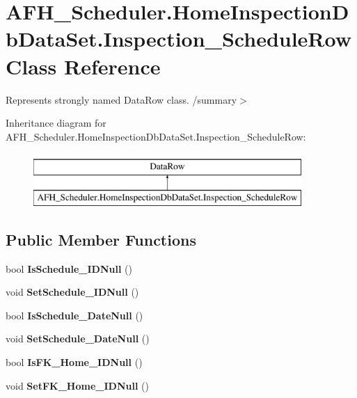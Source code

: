 \section{A\+F\+H\+\_\+\+Scheduler.\+Home\+Inspection\+Db\+Data\+Set.\+Inspection\+\_\+\+Schedule\+Row Class Reference}
\label{class_a_f_h___scheduler_1_1_home_inspection_db_data_set_1_1_inspection___schedule_row}


Represents strongly named Data\+Row class. /summary$>$  


Inheritance diagram for A\+F\+H\+\_\+\+Scheduler.\+Home\+Inspection\+Db\+Data\+Set.\+Inspection\+\_\+\+Schedule\+Row\+:\begin{figure}[H]
\begin{center}
\leavevmode
\includegraphics[height=2.000000cm]{class_a_f_h___scheduler_1_1_home_inspection_db_data_set_1_1_inspection___schedule_row}
\end{center}
\end{figure}
\subsection*{Public Member Functions}
\begin{DoxyCompactItemize}
\item 
\mbox{\label{class_a_f_h___scheduler_1_1_home_inspection_db_data_set_1_1_inspection___schedule_row_a7b9fed76e83859dfbe601bd934aa0bf4}} 
bool {\bfseries Is\+Schedule\+\_\+\+I\+D\+Null} ()
\item 
\mbox{\label{class_a_f_h___scheduler_1_1_home_inspection_db_data_set_1_1_inspection___schedule_row_a4d49aa921f7b8b19ccb8636b8e4cdaf7}} 
void {\bfseries Set\+Schedule\+\_\+\+I\+D\+Null} ()
\item 
\mbox{\label{class_a_f_h___scheduler_1_1_home_inspection_db_data_set_1_1_inspection___schedule_row_a4e478b4da6a5b566b8c011aa5a3e2286}} 
bool {\bfseries Is\+Schedule\+\_\+\+Date\+Null} ()
\item 
\mbox{\label{class_a_f_h___scheduler_1_1_home_inspection_db_data_set_1_1_inspection___schedule_row_a88da87bc32adc7ad77513072abdaabe3}} 
void {\bfseries Set\+Schedule\+\_\+\+Date\+Null} ()
\item 
\mbox{\label{class_a_f_h___scheduler_1_1_home_inspection_db_data_set_1_1_inspection___schedule_row_a36580d4acb13e9b73bff0778526825d6}} 
bool {\bfseries Is\+F\+K\+\_\+\+Home\+\_\+\+I\+D\+Null} ()
\item 
\mbox{\label{class_a_f_h___scheduler_1_1_home_inspection_db_data_set_1_1_inspection___schedule_row_a6a5874a6c006c4e9117992cd9b1d0af5}} 
void {\bfseries Set\+F\+K\+\_\+\+Home\+\_\+\+I\+D\+Null} ()
\end{DoxyCompactItemize}
